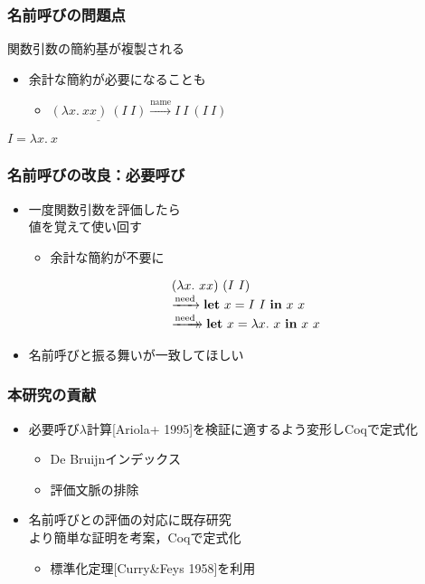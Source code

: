 \documentclass[dvipdfmx,cjk,xcolor=dvipsnames,envcountsect,notheorems,12pt]{beamer}
\theoremstyle{definition}
\newcommand{\xtwoheadrightarrow}[2][]{%
  \xrightarrow[#1]{#2}\mathrel{\mkern-14mu}\rightarrow
}
\newcommand{\LET}[3]{\mathbf{let}~#1=#2~\mathbf{in}~#3}
\newcommand{\CALLBYNEED}{\xrightarrow{\mathrm{need}}}
\newcommand{\CALLBYNAME}{\xrightarrow{\mathrm{name}}}
\newcommand{\RTCLOSCALLBYNEED}{\xtwoheadrightarrow{\mathrm{need}}}
\begin{document}
\begin{frame}
	\frametitle{名前呼びの問題点}
	\LARGE 関数引数の簡約基が複製される
	\begin{itemize}
		\item 余計な簡約が必要になることも
		\vfill
		\begin{itemize}
			\item $\underline{(\lambda x.~xx)~(I~I)} \CALLBYNAME I~I~(I~I)$
		\end{itemize}
	\end{itemize}
	\begin{flushright}
		\Large $I=\lambda x.~x$
	\end{flushright}
\end{frame}

\begin{frame}
	\frametitle{名前呼びの改良：必要呼び}
	\begin{itemize}
		\item 一度関数引数を評価したら\\値を覚えて使い回す
			\begin{itemize}
				\item 余計な簡約が不要に
			\end{itemize}
			\[\begin{array}{l}
				(\lambda x.~xx)~(I~I) \\
				\CALLBYNEED \LET{x}{I~I}{x~x} \\
				\RTCLOSCALLBYNEED \LET{x}{\lambda x.~x}{x~x}
			\end{array}\]
		\item 名前呼びと振る舞いが一致してほしい
	\end{itemize}
\end{frame}

\begin{frame}
	\frametitle{本研究の貢献}
	\begin{itemize}
		\item 必要呼び$\lambda$計算[Ariola+ 1995]を検証に適するよう変形しCoqで定式化
			\begin{itemize}
				\item De Bruijnインデックス
				\item 評価文脈の排除
			\end{itemize}
		\item 名前呼びとの評価の対応に\alert{既存研究\\より簡単な証明を考案}，Coqで定式化
			\begin{itemize}
				\item 標準化定理[Curry\&Feys 1958]を利用
			\end{itemize}
	\end{itemize}
\end{frame}
\end{document}

